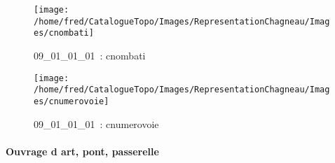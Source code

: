 \documentclass[12pt,titlepage]{book}
\begin{document}
\begin{figure}[h!]
  \begin{minipage}[t]{3cm}
    \begin{center}
      \texttt{[image: /home/fred/CatalogueTopo/Images/RepresentationChagneau/Images/cnombati]}
      \caption[~09\_01\_01\_01]{\small{09\_01\_01\_01~:} \tiny{cnombati}}\label{cnombati}
    \end{center}
  \end{minipage}
  \begin{minipage}[t]{3cm}
    \begin{center}
      \texttt{[image: /home/fred/CatalogueTopo/Images/RepresentationChagneau/Images/cnumerovoie]}
      \caption[~09\_01\_01\_01]{\small{09\_01\_01\_01~:} \tiny{cnumerovoie}}\label{cnumerovoie}
    \end{center}
  \end{minipage}
\end{figure}


\paragraph{Ouvrage d art, pont, passerelle}
\noindent
\vspace{\baselineskip}
\end{document}
